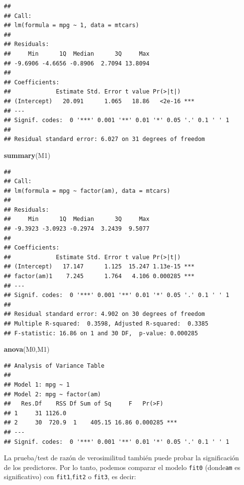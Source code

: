 \documentclass[]{article}
\newenvironment{Shaded}{\begin{snugshade}}{\end{snugshade}}
\newcommand{\KeywordTok}[1]{\textcolor[rgb]{0.13,0.29,0.53}{\textbf{{#1}}}}
\newcommand{\NormalTok}[1]{{#1}}
\numberwithin{equation}{section}
\begin{document}
\begin{verbatim}
## 
## Call:
## lm(formula = mpg ~ 1, data = mtcars)
## 
## Residuals:
##     Min      1Q  Median      3Q     Max 
## -9.6906 -4.6656 -0.8906  2.7094 13.8094 
## 
## Coefficients:
##             Estimate Std. Error t value Pr(>|t|)    
## (Intercept)   20.091      1.065   18.86   <2e-16 ***
## ---
## Signif. codes:  0 '***' 0.001 '**' 0.01 '*' 0.05 '.' 0.1 ' ' 1
## 
## Residual standard error: 6.027 on 31 degrees of freedom
\end{verbatim}

\begin{Shaded}
\begin{Highlighting}[]
\KeywordTok{summary}\NormalTok{(M1)}
\end{Highlighting}
\end{Shaded}

\begin{verbatim}
## 
## Call:
## lm(formula = mpg ~ factor(am), data = mtcars)
## 
## Residuals:
##     Min      1Q  Median      3Q     Max 
## -9.3923 -3.0923 -0.2974  3.2439  9.5077 
## 
## Coefficients:
##             Estimate Std. Error t value Pr(>|t|)    
## (Intercept)   17.147      1.125  15.247 1.13e-15 ***
## factor(am)1    7.245      1.764   4.106 0.000285 ***
## ---
## Signif. codes:  0 '***' 0.001 '**' 0.01 '*' 0.05 '.' 0.1 ' ' 1
## 
## Residual standard error: 4.902 on 30 degrees of freedom
## Multiple R-squared:  0.3598, Adjusted R-squared:  0.3385 
## F-statistic: 16.86 on 1 and 30 DF,  p-value: 0.000285
\end{verbatim}

\begin{Shaded}
\begin{Highlighting}[]
\KeywordTok{anova}\NormalTok{(M0,M1)}
\end{Highlighting}
\end{Shaded}

\begin{verbatim}
## Analysis of Variance Table
## 
## Model 1: mpg ~ 1
## Model 2: mpg ~ factor(am)
##   Res.Df    RSS Df Sum of Sq     F   Pr(>F)    
## 1     31 1126.0                                
## 2     30  720.9  1    405.15 16.86 0.000285 ***
## ---
## Signif. codes:  0 '***' 0.001 '**' 0.01 '*' 0.05 '.' 0.1 ' ' 1
\end{verbatim}

La prueba/test de razón de verosimilitud también puede probar la
significación de los predictores. Por lo tanto, podemos comparar el
modelo \texttt{fit0} (donde\texttt{am} es significativo) con
\texttt{fit1},\texttt{fit2} o \texttt{fit3}, es decir:
\end{document}
